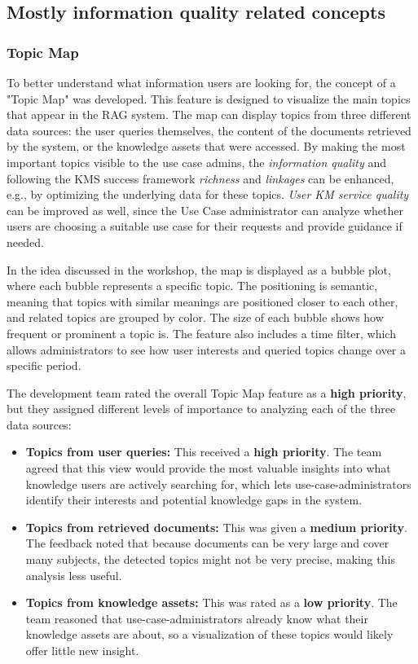 \documentclass[
	english,
	ruledheaders=section,%
	class=report,%
	thesis={type=bachelor},%
	accentcolor=1b,%
	custommargins=true,%
	marginpar=false,%
	parskip=half-,%
	fontsize=11pt,%
	DIV=14,
]{tudapub}
\begin{document}
\subsection{Mostly information quality related concepts}
\subsubsection{Topic Map}
To better understand what information users are looking for, the concept of a "Topic Map" was developed. This feature is designed to visualize the main topics that appear in the RAG system. The map can display topics from three different data sources: the user queries themselves, the content of the documents retrieved by the system, or the knowledge assets that were accessed. By making the most important topics visible to the use case admins, the \textit{information quality} and following the KMS success framework \textit{richness} and \textit{linkages} \parencite[pp.~57--58]{Jennex2006} can be enhanced, e.g., by optimizing the underlying data for these topics. \textit{User KM service quality} \parencite[pp.~58--59]{Jennex2006} can be improved as well, since the Use Case administrator can analyze whether users are choosing a suitable use case for their requests and provide guidance if needed.

In the idea discussed in the workshop, the map is displayed as a bubble plot, where each bubble represents a specific topic. The positioning is semantic, meaning that topics with similar meanings are positioned closer to each other, and related topics are grouped by color. The size of each bubble shows how frequent or prominent a topic is. The feature also includes a time filter, which allows administrators to see how user interests and queried topics change over a specific period.

The development team rated the overall Topic Map feature as a \textbf{high priority}, but they assigned different levels of importance to analyzing each of the three data sources:

\begin{itemize}
    \item \textbf{Topics from user queries:} This received a \textbf{high priority}. The team agreed that this view would provide the most valuable insights into what knowledge users are actively searching for, which lets use-case-administrators identify their interests and potential knowledge gaps in the system.
    
    \item \textbf{Topics from retrieved documents:} This was given a \textbf{medium priority}. The feedback noted that because documents can be very large and cover many subjects, the detected topics might not be very precise, making this analysis less useful.
    
    \item \textbf{Topics from knowledge assets:} This was rated as a \textbf{low priority}. The team reasoned that use-case-administrators already know what their knowledge assets are about, so a visualization of these topics would likely offer little new insight.
\end{itemize}
\end{document}
